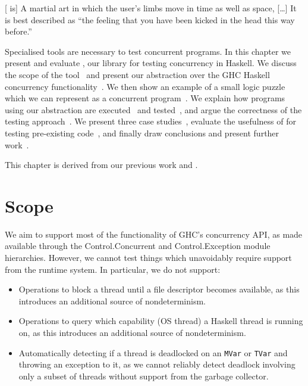 \begin{displayquote}
  {[}\dejafu{} is] A martial art in which the user's limbs move in
  time as well as space, [\ldots] It is best described as ``the
  feeling that you have been kicked in the head this way
  before.''\cite{pratchett2001}
\end{displayquote}

\noindent
Specialised tools are necessary to test concurrent programs.  In this
chapter we present and evaluate \dejafu{}, our library for testing
concurrency in Haskell.  We discuss the scope of the
tool~ and present our abstraction over the GHC
Haskell concurrency functionality~.  We then
show an example of a small logic puzzle which we can represent as a
concurrent program~.  We explain how programs using
our abstraction are executed~ and
tested~, and argue the correctness of the testing
approach~.  We present three case
studies~, evaluate the usefulness of
\dejafu{} for testing pre-existing code~, and
finally draw conclusions and present further
work~.

This chapter is derived from our previous work \cite{YCS-2016-503} and
\cite{walker2015}.

\section{Scope}
\label{sec:dejafu-scope}

We aim to support most of the functionality of GHC’s concurrency API,
as made available through the
Control.Concurrent\cite{control_concurrent} and
Control.Exception\cite{control_exception} module hierarchies.
However, we cannot test things which unavoidably require support from
the runtime system.  In particular, we do not support:

\begin{itemize}
\item Operations to block a thread until a file descriptor becomes
  available, as this introduces an additional source of
  nondeterminism.
\item Operations to query which capability (OS thread) a Haskell
  thread is running on, as this introduces an additional source of
  nondeterminism.
\item Automatically detecting if a thread is deadlocked on an
  \verb|MVar| or \verb|TVar| and throwing an exception to it, as we
  cannot reliably detect deadlock involving only a subset of threads
  without support from the garbage collector.
\end{itemize}

